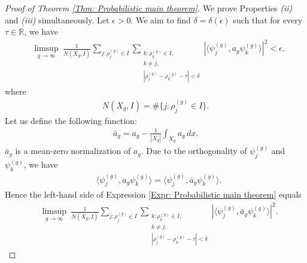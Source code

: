 \documentclass[11pt,twoside,reqno]{amsart} \usepackage{a4wide} \usepackage[T1]{fontenc} \usepackage[utf8]{inputenc} \usepackage{soul}  \usepackage{amsmath} \usepackage{amsfonts} \usepackage{amssymb} \usepackage{mathtools} \usepackage{amsthm} \usepackage{xcolor} \usepackage{graphicx} \usepackage{hyperref} \usepackage{standalone} \usepackage{esint} \usepackage{comment} \usepackage[left=2.3cm,top=3cm,right=2.3cm]{geometry} \usepackage{bm} \usepackage{svg} \usepackage{float} \numberwithin{equation}{section} \theoremstyle{plain} \newtheorem{thm}{Theorem}[section] \newtheorem{theorem}[thm]{Theorem} \newtheorem*{theorem*}{Theorem}\newtheorem{conj}[thm]{Conjecture} \newtheorem{lemma}[thm]{Lemma} \newtheorem{prop}[thm]{Proposition} \newtheorem{proposition}[thm]{Proposition} \newtheorem{cor}[thm]{Corollary} \newtheorem{question}[thm]{Question} \newtheorem{corollary}[thm]{Corollary} \newtheorem{assumption}[thm]{Assumption} \theoremstyle{definition} \newtheorem{defn}[thm]{Definition} \newtheorem{choice}[thm]{Choice} \newtheorem{definition}[thm]{Definition} \newtheorem{ex}[thm]{Example} \newtheorem{notation}[thm]{Notation} \newtheorem*{ack}{Acknowledgements} \theoremstyle{remark} \newtheorem{remark}[thm]{Remark} \newtheorem{bigremark}[thm]{Remark} \usepackage{xcolor} \newcommand{\red}[1]{ {\color{Red}#1} } \newcommand{\blue}[1]{ {\color{Blue}#1} } \author{Kai Hippi} \address{Aalto University, Espoo, Finland} \email{kai.hippi@aalto.fi}
\begin{document}
\begin{proof}[Proof of Theorem \ref{Thm: Probabilistic main theorem}]
	
	We prove Properties \emph{(ii)} and \emph{(iii)} simultaneously. Let $ \epsilon > 0 $. We aim to find $ \delta = \delta( \epsilon ) $ such that for every $ \tau \in \mathbb{R}$, we have
	\begin{align}
		&
		\label{Expr: Probabilistic main theorem}
		\limsup_{g \to \infty} \ \frac{1}{N( X_{g}, I )} \sum_{ j: \rho_{j}^{( g )} \in I  }^{} \sum_{ \substack{ k : \rho_{k}^{( g )} \in I, \\ k \neq j , \\ | \rho_{j}^{( g )} - \rho_{k}^{( g )} - \tau | < \delta }  }^{} \left| \langle \psi_{j}^{( g )}, a_{g} \psi_{k}^{( g )} \rangle \right|^{2} < \epsilon,
	\end{align}
	where 
	\begin{align*}
		N( X_{g}, I ) = \# \{ j : \rho_{j}^{( g )} \in I \}.
	\end{align*}
	Let us define the following function:
	\begin{align*}
		\bar{a}_{g} = a_{g} - \frac{1}{| X_{g} |} \int_{X_{g}} a_{g} \, dx.
	\end{align*}
	$ \bar{a}_{g} $ is a mean-zero normalization of $ a_{g} $. Due to the orthogonality of $ \psi_{j}^{( g )} $ and $ \psi_{k}^{( g )} $, we have
	\begin{align*}
		&
		\langle \psi_{j}^{( g )}, a_{g} \psi_{k}^{( g )} \rangle = \langle \psi_{j}^{( g )}, \bar{a}_{g} \psi_{k}^{( g )} \rangle.
	\end{align*}
	Hence the left-hand side of Expression \eqref{Expr: Probabilistic main theorem} equals
	\begin{align*}
		&
		\limsup_{g \to \infty} \ \frac{1}{N( X_{g}, I )} \sum_{ j: \rho_{j}^{( g )} \in I  }^{} \sum_{ \substack{ k : \rho_{k}^{( g )} \in  I , \\ k \neq j , \\ | \rho_{j}^{( g )} - \rho_{k}^{( g )} - \tau | < \delta }  }^{} \left| \langle \psi_{j}^{( g )}, \bar{a}_{g} \psi_{k}^{( g )} \rangle \right|^{2}.
	\end{align*}
	

\end{proof}
\end{document}
